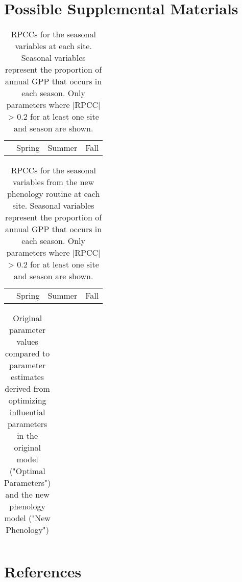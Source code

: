 \documentclass[]{article}
\begin{document}
\section{Possible Supplemental Materials}
\begin{table}[ht]
	\begin{threeparttable}
		\caption{RPCCs for the seasonal variables at each site. Seasonal variables represent the proportion of annual GPP that occurs in each season. Only parameters where |RPCC| > 0.2 for at least one site and season are shown.} 
		\begin{tabular}{lrrrrrrrrrrrr}
			\toprule
			& \multicolumn{4}{c}{Spring} & \multicolumn{4}{c}{Summer} & \multicolumn{4}{c}{Fall} \\
			\cmidrule(lr){2-5} \cmidrule(lr){6-9} \cmidrule(lr){10-13}
			
		\end{tabular}
	\end{threeparttable}
\end{table}

\begin{table}[ht]
	\begin{threeparttable}
		\caption{RPCCs for the seasonal variables from the new phenology routine at each site. Seasonal variables represent the proportion of annual GPP that occurs in each season. Only parameters where |RPCC| > 0.2 for at least one site and season are shown.} 
		\begin{tabular}{lrrrrrrrrrrrr}
			\toprule
			& \multicolumn{4}{c}{Spring} & \multicolumn{4}{c}{Summer} & \multicolumn{4}{c}{Fall} \\
			\cmidrule(lr){2-5} \cmidrule(lr){6-9} \cmidrule(lr){10-13}
			
		\end{tabular}
	\end{threeparttable}
\end{table}

\begin{table}[ht]
	\begin{threeparttable} %
		\caption{Original parameter values compared to parameter estimates derived from optimizing influential parameters in the original model ("Optimal Parameters") and the new phenology model ("New Phenology")} 
		\begin{tabularx}{.5\textwidth}{p{1.6cm}*{3}{>{\centering\arraybackslash}X}}
			\toprule
			
		\end{tabularx}
	\end{threeparttable}
\end{table}

\section{References}


\end{document}
